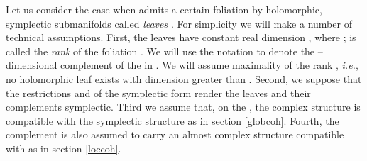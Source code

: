\documentclass[a4paper,a4paper]{article}
\begin{document}
Let us consider the case when \coordHE{} admits a certain foliation \coordHE{} 
by holomorphic, symplectic submanifolds \coordHE{} called {\it leaves} \cite{DEWITT}. 
For simplicity we will make a number of technical assumptions. 
First, the leaves \coordHE{} have constant real dimension \coordHE{}, 
where \coordHE{}; \coordHE{} is called the {\it rank}\/ of the foliation \coordHE{}. 
We will use the notation \coordHE{} to denote the \coordHE{}--dimensional 
complement of the \coordHE{} in \coordHE{}. We will assume maximality of 
the rank \coordHE{}, {\it i.e.}, no holomorphic leaf exists with dimension 
greater than \coordHE{}. Second, we suppose that the restrictions 
\coordHE{}  and \coordHE{} of the symplectic form \coordHE{} 
render the leaves \coordHE{} and their complements \coordHE{} symplectic.
Third we assume that, on the \coordHE{}, the complex structure is 
compatible with the symplectic structure as in section \ref{globcoh}. 
Fourth, the complement \coordHE{} is also assumed to carry an almost 
complex structure compatible with \coordHE{} as in section \ref{loccoh}.
\end{document}
